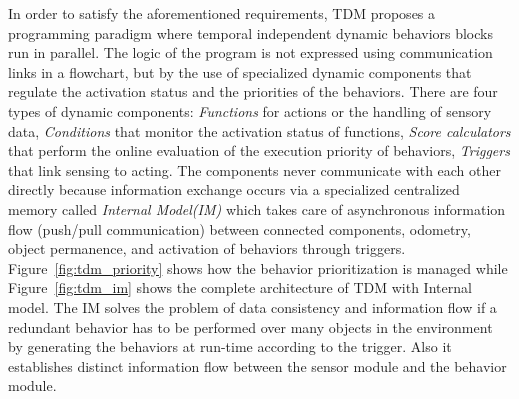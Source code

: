 %
In order to satisfy the aforementioned requirements, TDM proposes a programming paradigm where temporal independent dynamic behaviors blocks run in parallel. The logic of the program is not expressed using communication links in a flowchart, but by the use of specialized dynamic components that regulate the activation status and the priorities of the behaviors. There are four types of dynamic components: \emph{Functions} for actions or the handling of sensory data, \emph{Conditions} that monitor the activation status of functions, \emph{Score calculators} that perform the online evaluation of the execution priority of behaviors, \emph{Triggers} that link sensing to acting. The components never communicate with each other directly because information exchange occurs via a specialized centralized memory called \emph{Internal Model(IM)} which takes care of asynchronous information flow (push/pull communication) between connected components, odometry, object permanence, and activation of behaviors through triggers. Figure~\ref{fig:tdm_priority} shows how the behavior prioritization is managed while Figure~\ref{fig:tdm_im} shows the complete architecture of TDM with Internal model. The IM solves the problem of data consistency and information flow if a redundant behavior has to be performed over many objects in the environment by generating the behaviors at run-time according to the trigger. Also it establishes distinct information flow between the sensor module and the behavior module.
